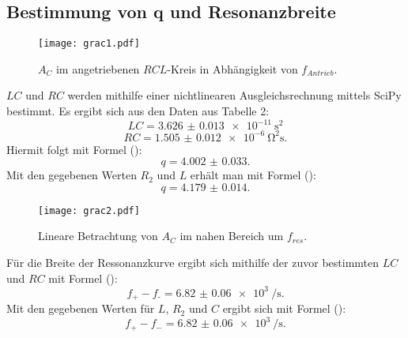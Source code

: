 \subsection{Bestimmung von q und Resonanzbreite}
\begin{figure}[H]
	\centering
	\caption{$A_C$ im angetriebenen $RCL$-Kreis in Abhängigkeit von $f_{Antrieb}$.}
	\texttt{[image: grac1.pdf]}
	\label{fig:grac1}
\end{figure}
$LC$ und $RC$ werden mithilfe einer nichtlinearen Ausgleichsrechnung mittels SciPy \cite{scipy} bestimmt. Es ergibt sich aus den Daten aus Tabelle 2: 
\begin{displaymath}
LC = \SI{3.626(13)e-11}{\second\squared}
\end{displaymath}
\begin{displaymath}
RC = \SI{1.505(12)e-6}{\ohm\squared\second}\text{.}
\end{displaymath}
Hiermit folgt mit Formel ():
\begin{displaymath}
q = \num{4.002(33)}\text{.}
\end{displaymath}
Mit den gegebenen Werten $R_2$ und $L$ erhält man mit Formel ():
\begin{displaymath}
q = \num{4.179(14)}\text{.}
\end{displaymath}


\begin{figure}[H]
	\centering
	\caption{Lineare Betrachtung von $A_C$ im nahen Bereich um $f_{res}$.}
	\texttt{[image: grac2.pdf]}
	\label{fig:grac2}
\end{figure}

Für die Breite der Ressonanzkurve ergibt sich mithilfe der zuvor bestimmten $LC$ und $RC$ mit Formel ():
\begin{displaymath}
f_\text{+} - f_\text{-} = \SI{6.82(6)e3}{\per\second}\text{.}
\end{displaymath}
Mit den gegebenen Werten für $L$, $R_2$ und $C$ ergibt sich mit Formel ():
\begin{displaymath}
f_+ - f_- = \SI{6.82(6)e3}{\per\second}\text{.}
\end{displaymath}



